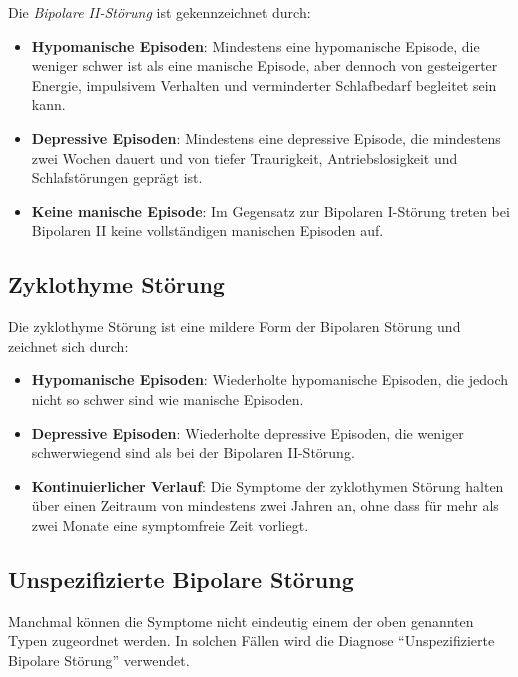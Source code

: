 Die \emph{Bipolare II-Störung} ist gekennzeichnet durch:

\begin{itemize}
\item \textbf{Hypomanische Episoden}: Mindestens eine hypomanische Episode, die weniger schwer ist als eine manische Episode, aber dennoch von gesteigerter Energie, impulsivem Verhalten und verminderter Schlafbedarf begleitet sein kann.

\item \textbf{Depressive Episoden}: Mindestens eine depressive Episode, die mindestens zwei Wochen dauert und von tiefer Traurigkeit, Antriebslosigkeit und Schlafstörungen geprägt ist.

\item \textbf{Keine manische Episode}: Im Gegensatz zur Bipolaren I-Störung treten bei Bipolaren II keine vollständigen manischen Episoden auf.
\end{itemize}

\subsection{Zyklothyme Störung}

Die zyklothyme Störung ist eine mildere Form der Bipolaren Störung und zeichnet sich durch:

\begin{itemize}
\item \textbf{Hypomanische Episoden}: Wiederholte hypomanische Episoden, die jedoch nicht so schwer sind wie manische Episoden.

\item \textbf{Depressive Episoden}: Wiederholte depressive Episoden, die weniger schwerwiegend sind als bei der Bipolaren II-Störung.

\item \textbf{Kontinuierlicher Verlauf}: Die Symptome der zyklothymen Störung halten über einen Zeitraum von mindestens zwei Jahren an, ohne dass für mehr als zwei Monate eine symptomfreie Zeit vorliegt.
\end{itemize}

\subsection{Unspezifizierte Bipolare Störung}

Manchmal können die Symptome nicht eindeutig einem der oben genannten Typen zugeordnet werden. In solchen Fällen wird die Diagnose \enquote{Unspezifizierte Bipolare Störung} verwendet.

